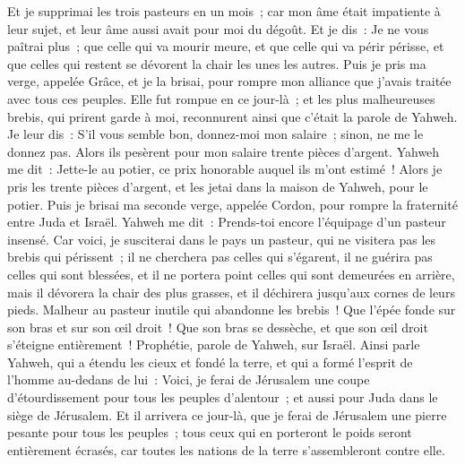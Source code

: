 \begin{multicols}{2}
Et je supprimai les trois pasteurs en un mois~; car mon âme était impatiente à leur sujet, et leur âme aussi avait pour moi du dégoût.
Et je dis~: Je ne vous paîtrai plus~; que celle qui va mourir meure, et que celle qui va périr périsse, et que celles qui restent se dévorent la chair les unes les autres.
Puis je pris ma verge, appelée Grâce, et je la brisai, pour rompre mon alliance que j'avais traitée avec tous ces peuples.
Elle fut rompue en ce jour-là~; et les plus malheureuses brebis, qui prirent garde à moi, reconnurent ainsi que c'était la parole de Yahweh.
Je leur dis~: S'il vous semble bon, donnez-moi mon salaire~; sinon, ne me le donnez pas. Alors ils pesèrent pour mon salaire trente pièces d'argent.
Yahweh me dit~: Jette-le au potier, ce prix honorable auquel ils m'ont estimé~! Alors je pris les trente pièces d'argent, et les jetai dans la maison de Yahweh, pour le potier.
Puis je brisai ma seconde verge, appelée Cordon, pour rompre la fraternité entre Juda et Israël.
Yahweh me dit~: Prends-toi encore l'équipage d'un pasteur insensé.
Car voici, je susciterai dans le pays un pasteur, qui ne visitera pas les brebis qui périssent~; il ne cherchera pas celles qui s'égarent, il ne guérira pas celles qui sont blessées, et il ne portera point celles qui sont demeurées en arrière, mais il dévorera la chair des plus grasses, et il déchirera jusqu'aux cornes de leurs pieds.
Malheur au pasteur inutile qui abandonne les brebis~! Que l'épée fonde sur son bras et sur son œil droit~! Que son bras se dessèche, et que son œil droit s'éteigne entièrement~!
\VerseOne{}Prophétie, parole de Yahweh, sur Israël. Ainsi parle Yahweh, qui a étendu les cieux et fondé la terre, et qui a formé l'esprit de l'homme au-dedans de lui~:
Voici, je ferai de Jérusalem une coupe d'étourdissement pour tous les peuples d'alentour~; et aussi pour Juda dans le siège de Jérusalem.
Et il arrivera ce jour-là, que je ferai de Jérusalem une pierre pesante pour tous les peuples~; tous ceux qui en porteront le poids seront entièrement écrasés, car toutes les nations de la terre s'assembleront contre elle.

\end{multicols}
